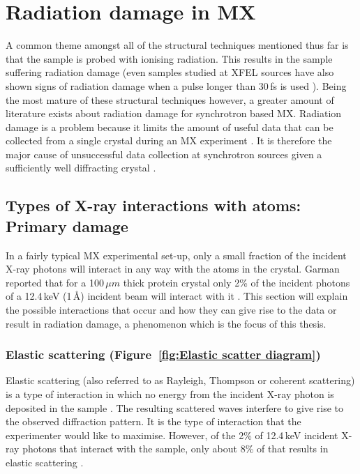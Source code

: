 \section{Radiation damage in MX}
\label{sec:Radiation damage in MX}
    A common theme amongst all of the structural techniques mentioned thus far is that the sample is probed with ionising radiation.
    This results in the sample suffering radiation damage (even samples studied at XFEL sources have also shown signs of radiation damage when a pulse longer than 30$\,$fs is used \cite{nass2015indications}).
    Being the most mature of these structural techniques however, a greater amount of literature exists about radiation damage for synchrotron based MX.
    Radiation damage is a problem because it limits the amount of useful data that can be collected from a single crystal during an MX experiment \cite{garman2010}.
    It is therefore the major cause of unsuccessful data collection at synchrotron sources given a sufficiently well diffracting crystal \cite{zeldin2013dwd}.

    \subsection{Types of X-ray interactions with atoms: Primary damage}
    \label{sub:Types of X-ray interactions with atoms: Primary damage}
        In a fairly typical MX experimental set-up, only a small fraction of the incident X-ray photons will interact in any way with the atoms in the crystal.
        Garman reported that for a 100$\,\mu m$ thick protein crystal only 2\% of the incident photons of a 12.4$\,$keV (1$\,$\AA) incident beam will interact with it \cite{garman2010}.
        This section will explain the possible interactions that occur and how they can give rise to the data or result in radiation damage, a phenomenon which is the focus of this thesis.

        \subsubsection{Elastic scattering (Figure~\ref{fig:Elastic scatter diagram})}
        \label{subs:Elastic scattering}
            Elastic scattering (also referred to as Rayleigh, Thompson or coherent scattering) is a type of interaction in which no energy from the incident X-ray photon is deposited in the sample \cite{nave1995}.
            The resulting scattered waves interfere to give rise to the observed diffraction pattern.
            It is the type of interaction that the experimenter would like to maximise.
            However, of the 2\% of 12.4$\,$keV incident X-ray photons that interact with the sample, only about 8\% of that results in elastic scattering \cite{ravelli2006radiation}.

